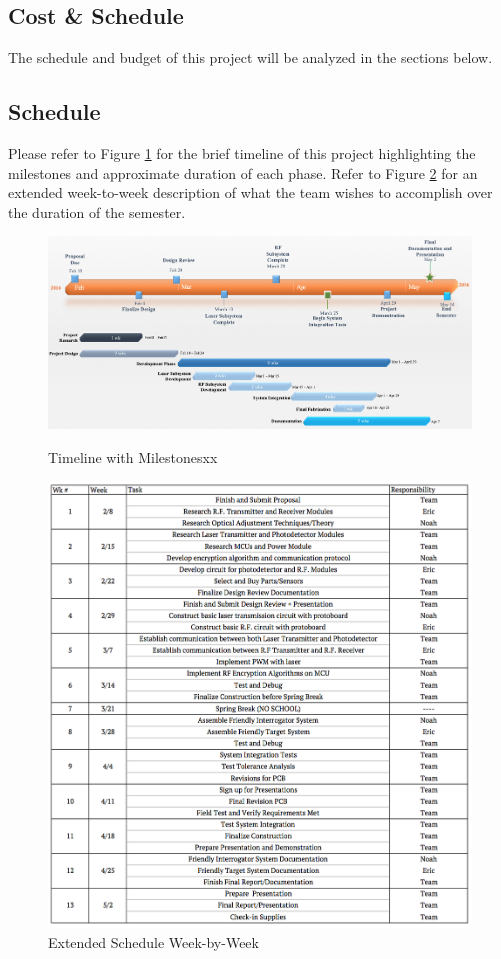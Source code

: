 \documentclass[openbib,letterpaper,10pt]{article}
\begin{document}
\begin{spacing}{1.15}
\section{Cost \& Schedule}
The schedule and budget of this project will be analyzed in the sections below.

\subsection{Schedule}
Please refer to Figure \ref{fig:timeline} for the brief timeline of this project highlighting the milestones and approximate duration of each phase. Refer to Figure \ref{fig:schedule} for an extended week-to-week description of what the team wishes to accomplish over the duration of the semester.


\begin{figure} [H]
	\centering
	\includegraphics[scale=0.5]{Timeline.png}
	\label{fig:timeline}
	\caption{Timeline with Milestones\label{fig:timeline}xx}
\end{figure}

\begin{figure} [H]
	\centering
	\includegraphics[scale=0.95]{Schedule_Extended.png}
	\caption{Extended Schedule Week-by-Week\label{fig:schedule}}
\end{figure}



\end{spacing}
\end{document}
